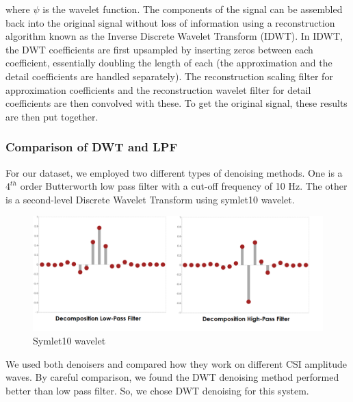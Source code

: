 where $\psi$ is the wavelet function. The components of the signal can be assembled back into the original signal without loss of information using a reconstruction algorithm known as the Inverse Discrete Wavelet Transform (IDWT). In IDWT, the DWT coefficients are first upsampled by inserting zeros between each coefficient, essentially doubling the length of each (the approximation and the detail coefficients are handled separately). The reconstruction scaling filter for approximation coefficients and the reconstruction wavelet filter for detail coefficients are then convolved with these. To get the original signal, these results are then put together. 

\subsubsection{Comparison of DWT and LPF}
For our dataset, we employed two different types of denoising methods. One is a $4^{th}$ order Butterworth low pass filter with a cut-off frequency of 10 Hz. The other is a second-level Discrete Wavelet Transform using symlet10 wavelet. 

\begin{figure}[H]
\centering
\includegraphics[width=1.0\textwidth]{./figure/chap 4/sym10.png}
\caption{Symlet10 wavelet}
\label{Fig 4.14}
\end{figure}

We used both denoisers and compared how they work on different CSI amplitude waves. By careful comparison, we found the DWT denoising method performed better than low pass filter. So, we chose DWT denoising for this system.

